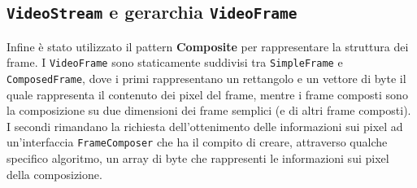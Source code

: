 \documentclass[a4paper,11pt]{article}
\begin{document}
	
	\subsection{\texttt{VideoStream} e gerarchia \texttt{VideoFrame}}
	Infine è stato utilizzato il pattern \textbf{Composite} per rappresentare la struttura dei frame. I \texttt{VideoFrame} sono staticamente suddivisi tra \texttt{SimpleFrame} e \texttt{ComposedFrame}, dove i primi rappresentano un rettangolo e un vettore di byte il quale rappresenta il contenuto dei pixel del frame, mentre i frame composti sono la composizione su due dimensioni dei frame semplici (e di altri frame composti). I secondi rimandano la richiesta dell'ottenimento delle informazioni sui pixel ad un'interfaccia \texttt{FrameComposer} che ha il compito di creare, attraverso qualche specifico algoritmo, un array di byte che rappresenti le informazioni sui pixel della composizione.
	
\end{document}
